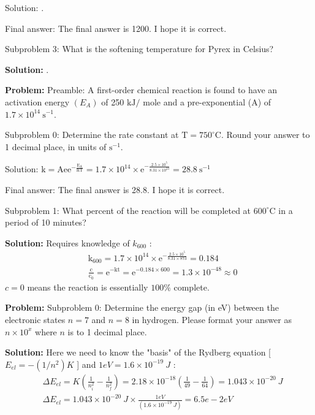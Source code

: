 \documentclass[10pt]{article}
\begin{document}
Solution: .

Final answer: The final answer is 1200. I hope it is correct.

Subproblem 3: What is the softening temperature for Pyrex in Celsius?


\textbf{Solution:}
.


\textbf{Problem:}
Preamble: A first-order chemical reaction is found to have an activation energy $\left(E_{A}\right)$ of 250 $\mathrm{kJ} /$ mole and a pre-exponential (A) of $1.7 \times 10^{14} \mathrm{~s}^{-1}$.

Subproblem 0: Determine the rate constant at $\mathrm{T}=750^{\circ} \mathrm{C}$. Round your answer to 1 decimal place, in units of $\mathrm{s}^{-1}$.


Solution: $\mathrm{k}=\mathrm{Ae} \mathrm{e}^{-\frac{\mathrm{E}_{\mathrm{A}}}{\mathrm{RT}}}=1.7 \times 10^{14} \times \mathrm{e}^{-\frac{2.5 \times 10^{5}}{8.31 \times 10^{23}}}= \boxed{28.8} \mathrm{~s}^{-1}$

Final answer: The final answer is 28.8. I hope it is correct.

Subproblem 1: What percent of the reaction will be completed at $600^{\circ} \mathrm{C}$ in a period of 10 minutes?


\textbf{Solution:}
Requires knowledge of $k_{600}$ :
\[
\begin{aligned}
&\mathrm{k}_{600}=1.7 \times 10^{14} \times \mathrm{e}^{-\frac{2.5 \times 10^{5}}{8.31 \times 873}}=0.184 \\
&\frac{\mathrm{c}}{\mathrm{c}_{0}}=\mathrm{e}^{-\mathrm{kt}}=\mathrm{e}^{-0.184 \times 600}=1.3 \times 10^{-48} \approx 0
\end{aligned}
\]
$c=0$ means the reaction is essentially $ \boxed{100} \%$ complete.


\textbf{Problem:}
Subproblem 0: Determine the energy gap (in eV) between the electronic states $n=7$ and $n=8$ in hydrogen. Please format your answer as $n \times 10^x$ where $n$ is to 1 decimal place. 


\textbf{Solution:}
Here we need to know the "basis" of the Rydberg equation [ $E_{e l}=-\left(1 / n^{2}\right) K$ ] and $1 {eV}=1.6 \times 10^{-19} {~J}$ :
\[
\begin{aligned}
&\Delta {E}_{{el}}={K}\left(\frac{1}{{n}_{{i}}^{2}}-\frac{1}{{n}_{{f}}^{2}}\right)=2.18 \times 10^{-18}\left(\frac{1}{49}-\frac{1}{64}\right)=1.043 \times 10^{-20} {~J} \\
&\Delta {E}_{{el}}=1.043 \times 10^{-20} {~J} \times \frac{1 {eV}}{\left(1.6 \times 10^{-19} {~J}\right)}= \boxed{6.5e-2} {eV}
\end{aligned}
\]
\end{document}
